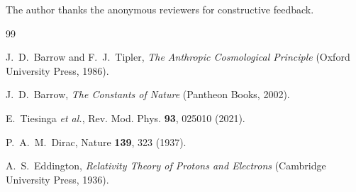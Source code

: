 \documentclass[twocolumn,showpacs,preprintnumbers,amsmath,amssymb,prl]{revtex4-2}
\begin{document}
\begin{acknowledgments}
The author thanks the anonymous reviewers for constructive feedback.
\end{acknowledgments}

\begin{thebibliography}{99}

J.~D.~Barrow and F.~J.~Tipler, \textit{The Anthropic Cosmological Principle} (Oxford University Press, 1986).

J.~D.~Barrow, \textit{The Constants of Nature} (Pantheon Books, 2002).

E.~Tiesinga \textit{et al.}, Rev. Mod. Phys. \textbf{93}, 025010 (2021).

P.~A.~M.~Dirac, Nature \textbf{139}, 323 (1937).

A.~S.~Eddington, \textit{Relativity Theory of Protons and Electrons} (Cambridge University Press, 1936).

\end{thebibliography}
\end{document}
